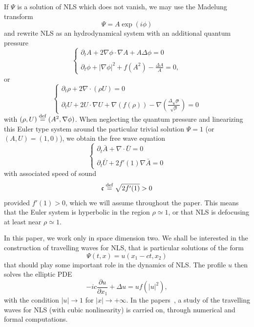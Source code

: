 \documentclass[AHL,Unicode,longabstracts,published]{cedram}
\newcommand*\p{\partial}
\newcommand*\ddef{\stackrel{\rm def}{=}}
\newcommand*\ds{\displaystyle}
\newcommand*\cs{{\mathfrak c}}
\newcommand*\ii{\infty}
\begin{document}
If $\Psi$ is a solution of NLS which does not vanish, we may use the Madelung transform
\[
\Psi = A \exp(i \phi)
\]
and rewrite NLS as an hydrodynamical system with an additional quantum pressure
\begin{equation}\label{Madelo}
\begin{cases}
\ds{ \p_t A + 2 \nabla \phi \cdot \nabla A + A \Delta \phi } = 0 \\ \ \\
\ds{ \p_{t} \phi + |\nabla \phi|^2 + f (A^2) - \frac{ \Delta A }{A} } = 0,
\end{cases}
\end{equation} or
\[
\begin{cases}
\ds{ \p_t \rho + 2 \nabla \cdot (\rho U) } = 0 \\ \ \\
\ds{ \p_{t} U + 2 U \cdot \nabla U + \nabla (f (\rho)) - \nabla \left(\frac{ \Delta \sqrt{\rho} }{\sqrt{\rho}} \right) } = 0
\end{cases}
\]
with $(\rho,U) \ddef (A^2,\nabla \phi)$. When neglecting the quantum pressure and linearizing this Euler type system around the particular trivial solution $\Psi = 1$ (or $(A,U)= (1,0)$), we obtain the free wave equation
\[
\begin{cases}
\ds{ \p_t \bar{A} + \nabla \cdot \bar{U} } = 0 \\ \ \\
\ds{ \p_{t} \bar{U} + 2 f'(1) \nabla \bar{A} } = 0
\end{cases}
\]
with associated speed of sound
\[
\cs \ddef \sqrt{ 2 f'(1)} > 0
\]
provided $f'(1) > 0 $, which we will assume throughout the paper. This means that the Euler system is hyperbolic in the region $ \rho \simeq 1$, or that NLS is defocusing at least near $ \rho \simeq 1$.

In this paper, we work only in space dimension two. We shall be interested in the construction of travelling waves for NLS, that is particular solutions of the form
\[
\Psi (t,x) = u (x_1 -c t,x_2)
\]
that should play some important role in the dynamics of NLS. The profile $ u $ then solves the elliptic PDE
\begin{equation}
\tag{TW$_c$} - i c \frac{\p u}{\p x_1} + \Delta u = u f\left(|u|^2\right),
\end{equation}
with the condition $ |u | \to 1 $ for $ |x| \to +\ii $. In the papers~\cite{JR,JPR}, a study of the travelling waves for NLS (with cubic nonlinearity) is carried on, through numerical and formal computations.
\end{document}
